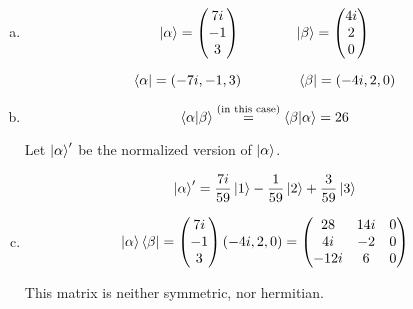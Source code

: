 \documentclass[a4paper,german,12pt,smallheadings]{scrartcl}
\begin{document}
\begin{enumerate}[a)]
  \item
    \begin{equation*}
      \ket{\alpha} = \begin{pmatrix} 7i \\ -1 \\ 3\end{pmatrix}
      \qquad\qquad
      \ket{\beta} = \begin{pmatrix} 4i \\ 2 \\ 0\end{pmatrix}
    \end{equation*}

    \begin{equation*}
      \bra{\alpha} = (-7i, -1, 3)
      \qquad
      \qquad
      \bra{\beta} = (-4i, 2, 0)
    \end{equation*}

  \item
    \begin{equation*}
      \braket{\alpha|\beta} \overset{\text{(in this case)}}{=} \braket{\beta|\alpha} = 26
    \end{equation*}

    Let $\ket{\alpha}'$ be the normalized version of $\ket{\alpha}$.

    \begin{equation*}
      \ket{\alpha}' = \frac{7i}{59}\ket{1} -\frac{1}{59}\ket{2} + \frac{3}{59}\ket{3}
    \end{equation*}

  \item
    \begin{equation*}
      \ket{\alpha}\bra{\beta} =
      \begin{pmatrix} 7i \\ -1 \\ 3 \end{pmatrix}
        (-4i, 2, 0)
        =
        \begin{pmatrix}
          28 & 14i & 0 \\
          4i & -2 & 0 \\
          -12i & 6 & 0
        \end{pmatrix}
    \end{equation*}

    This matrix is neither symmetric, nor hermitian.

\end{enumerate}
\end{document}
